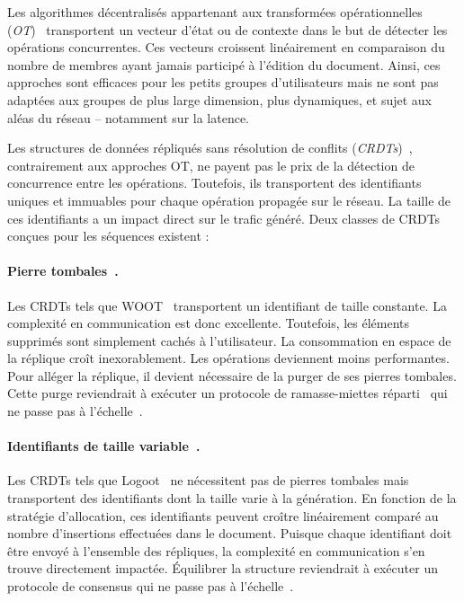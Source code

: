 Les algorithmes décentralisés appartenant aux transformées opérationnelles
(\emph{OT})~\cite{sun1998operational, sun2009contextbased} transportent un
vecteur d'état ou de contexte dans le but de détecter les opérations
concurrentes. Ces vecteurs croissent linéairement en comparaison du nombre de
membres ayant jamais participé à l'édition du document. Ainsi, ces approches
sont efficaces pour les petits groupes d'utilisateurs mais ne sont pas adaptées
aux groupes de plus large dimension, plus dynamiques, et sujet aux aléas du
réseau -- notamment sur la latence.

Les structures de données répliqués sans résolution de conflits
(\emph{CRDTs})~\cite{burckhardt2014replicated, shapiro2011comprehensive,
shapiro2011conflict}, contrairement aux approches OT, ne payent pas le prix de
la détection de concurrence entre les opérations. Toutefois, ils transportent
des identifiants uniques et immuables pour chaque opération propagée sur le
réseau. La taille de ces identifiants a un impact direct sur le trafic généré.
Deux classes de CRDTs conçues pour les séquences existent :

\paragraph{Pierre tombales~\cite{ahmed2011evaluating, attiya2016specification,
conway2014language, grishchenko2010deep, oster2006data, roh2011replicated,
weiss2007wooki, wu2010partial, yu2012stringwise}.} Les CRDTs tels que
WOOT~\cite{oster2006data} transportent un identifiant de taille constante. La
complexité en communication est donc excellente. Toutefois, les éléments
supprimés sont simplement cachés à l'utilisateur. La consommation en espace de
la réplique croît inexorablement. Les opérations deviennent moins
performantes. Pour alléger la réplique, il devient nécessaire de la purger de
ses pierres tombales. Cette purge reviendrait à exécuter un protocole de
ramasse-miettes réparti~\cite{abdullahi1998garbage} qui ne passe pas à
l'échelle~\cite{abdullahi1998garbage}.

\paragraph{Identifiants de taille variable~\cite{andre2013supporting,
 preguica2009commutative, weiss2009logoot}.} Les CRDTs tels que
Logoot~\cite{weiss2009logoot} ne nécessitent pas de pierres tombales mais
transportent des identifiants dont la taille varie à la génération. En fonction
de la stratégie d'allocation, ces identifiants peuvent croître linéairement
comparé au nombre d'insertions effectuées dans le document. Puisque chaque
identifiant doit être envoyé à l'ensemble des répliques, la complexité en
communication s'en trouve directement impactée.  Équilibrer la structure
reviendrait à exécuter un protocole de consensus qui ne passe pas à
l'échelle~\cite{mostefaoui2015signature}.

